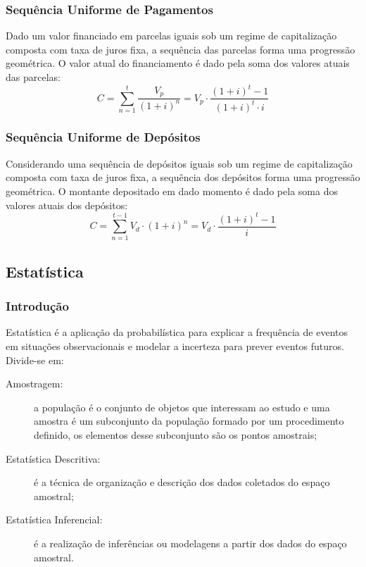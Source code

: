     \subsubsection{Sequência Uniforme de Pagamentos}
        Dado um valor financiado em parcelas iguais sob um regime de capitalização composta com taxa de juros fixa, a sequência das parcelas forma uma progressão geométrica. O valor atual do financiamento é dado pela soma dos valores atuais das parcelas:
        \[ C = \displaystyle\sum_{n=1}^{t} {\frac{V_p}{(1+i)^n}} = V_p \cdot \frac{(1+i)^t - 1}{(1+i)^t \cdot i} \]
    \subsubsection{Sequência Uniforme de Depósitos}
        Considerando uma sequência de depósitos iguais sob um regime de capitalização composta com taxa de juros fixa, a sequência dos depósitos forma uma progressão geométrica. O montante depositado em dado momento é dado pela soma dos valores atuais dos depósitos:
        \[ C = \displaystyle\sum_{n=1}^{t-1} {V_d \cdot (1+i)^n} = V_d \cdot \frac{(1+i)^t -1}{i} \]
\subsection{Estatística}
    \subsubsection{Introdução}
        Estatística é a aplicação da probabilística para explicar a frequência de eventos em situações observacionais e modelar a incerteza para prever eventos futuros. Divide-se em:
        \begin{description}
            \item[Amostragem:] a população é o conjunto de objetos que interessam ao estudo e uma amostra é um subconjunto da população formado por um procedimento definido, os elementos desse subconjunto são os pontos amostrais;
            \item[Estatística Descritiva:] é a técnica de organização e descrição dos dados coletados do espaço amostral;
            \item[Estatística Inferencial:] é a realização de inferências ou modelagens a partir dos dados do espaço amostral.
        \end{description}
